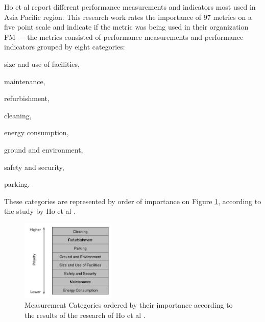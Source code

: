 Ho et al \cite{Ho2000} report different performance measurements and indicators most used in Asia Pacific region. This research work rates the importance of 97 metrics on a five point scale and indicate if the metric was being used in their organization FM --- the metrics consisted of performance measurements and performance indicators grouped by eight categories:
\begin{enumerate*}[label=\itshape\roman{enumi})]
 	\item size and use of facilities,
 	\item maintenance,
 	\item refurbishment,
 	\item cleaning,
 	\item energy consumption,
 	\item ground and environment,
 	\item safety and security,
 	\item parking.
\end{enumerate*}
These categories are represented by order of importance on Figure \ref{fig:MeasurementCatPriority}, according to the study by Ho et al \cite{Ho2000}.

\begin{figure}[t!]
  \centering
  \includegraphics[width=0.40\textwidth]{img/MeasurementCatPriority.jpg}
  \caption{Measurement Categories ordered by their importance according to the results of the research of Ho et al \cite{Ho2000}.}
  \label{fig:MeasurementCatPriority}
\end{figure}



